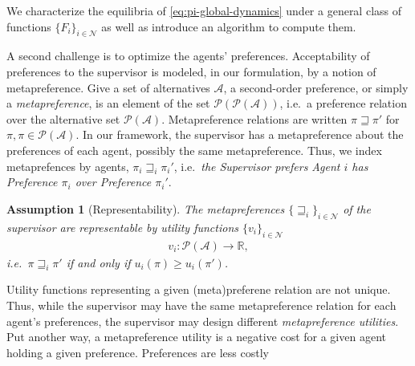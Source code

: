 \documentclass[conference]{ieeeconf}
\newcommand{\R}{\mathbb{R}}
\newcommand{\N}{\mathcal{N}}
\newcommand{\A}{\mathcal{A}}
\renewcommand{\P}{\mathcal{P}}
\newcommand{\metaprefers}{\sqsupseteq}
\renewcommand{\geq}{\geqslant}
\newtheorem{assumption}{Assumption}
\begin{document}
We characterize the equilibria of \eqref{eq:pi-global-dynamics} under a general class of functions $\{ F_i \}_{i \in \N}$ as well as introduce an algorithm to compute them.

A second challenge is to optimize the agents' preferences.
Acceptability of preferences to the supervisor is modeled, in our formulation, by a notion of metapreference. Give a set of alternatives $\A$, a second-order preference, or simply a \emph{metapreference}, is an element of the set $\P(\P(\A))$, i.e.~a preference relation over the alternative set $\P(\A)$. Metapreference relations are written $\pi \metaprefers \pi'$ for $\pi, \pi \in \P(\A)$. In our framework, the supervisor has a metapreference about the preferences of each agent, possibly the same metapreference. Thus, we index metaprefences by agents, $\pi_i \metaprefers_i \pi_i'$, i.e.~\emph{the Supervisor prefers Agent $i$ has Preference $\pi_i$ over Preference $\pi_i'$}.

\begin{assumption}[Representability] \label{ass:represent}
    The metapreferences $\{ \metaprefers_i \}_{i \in \N}$ of the supervisor are representable by utility functions $\{ v_i \}_{i \in \N}$
    \begin{align}
        v_i : \P(\A) \to \R, \label{eq:utility-meta}
    \end{align}
    i.e.~$\pi \metaprefers_i \pi'$ if and only if $u_i(\pi) \geq u_i(\pi')$.
\end{assumption}

Utility functions representing a given (meta)preferene relation are not unique. Thus, while the supervisor may have the same metapreference relation for each agent's preferences, the supervisor may design different \emph{metapreference utilities}. Put another way, a metapreference utility is a negative cost for a given agent holding a given preference. Preferences are less costly 
\end{document}
